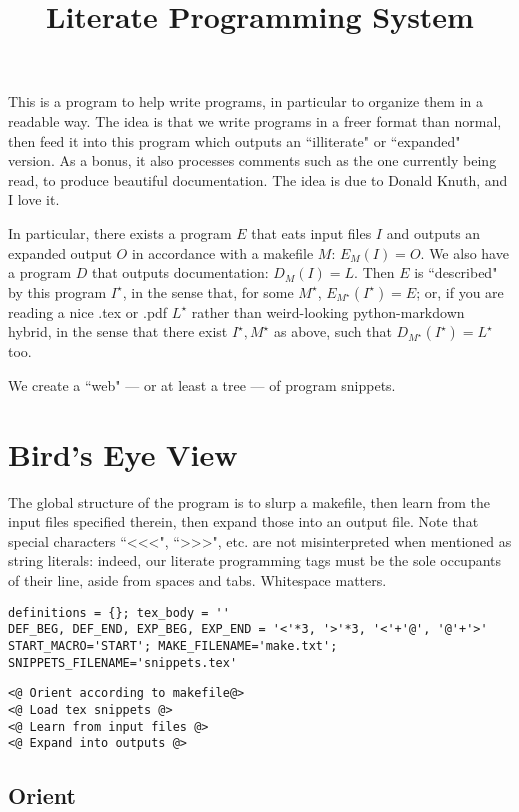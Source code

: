 \documentclass{article}
\begin{document}
\title{Literate Programming System}
\maketitle

This is a program to help write programs, in particular to organize them in a
readable way. The idea is that we write programs in a freer format than normal,
then feed it into this program which outputs an ``illiterate" or ``expanded"
version. As a bonus, it also processes comments such as the one currently being
read, to produce beautiful documentation. The idea is due to Donald Knuth, and I
love it.

In particular, there exists a program $E$ that eats input files $I$ and outputs
an expanded output $O$ in accordance with a makefile $M$: $E_M(I)=O$. We also
have a program $D$ that outputs documentation: $D_M(I)=L$. Then $E$ is
``described" by this program $I^\star$, in the sense that, for some $M^\star$,
$E_{M^\star}(I^\star)=E$; or, if you are reading a nice .tex or .pdf $L^\star$
rather than weird-looking python-markdown hybrid, in the sense that there exist
$I^\star, M^\star$ as above, such that $D_{M^\star}(I^\star)=L^\star$ too.

We create a ``web" --- or at least a tree --- of program snippets.

\section{Bird's Eye View}The global structure of the program is to slurp a makefile, then learn from the
input files specified therein, then expand those into an output file. Note that
special characters ``<<<", ``>>>", etc. are not misinterpreted when mentioned as
string literals: indeed, our literate programming tags must be the sole
occupants of their line, aside from spaces and tabs. Whitespace matters.

{\color{YellowOrange}\begin{verbatim}definitions = {}; tex_body = ''
DEF_BEG, DEF_END, EXP_BEG, EXP_END = '<'*3, '>'*3, '<'+'@', '@'+'>'
START_MACRO='START'; MAKE_FILENAME='make.txt'; SNIPPETS_FILENAME='snippets.tex'
\end{verbatim}}{\color{MidnightBlue}\begin{verbatim}<@ Orient according to makefile@>
<@ Load tex snippets @>
<@ Learn from input files @>
<@ Expand into outputs @>
\end{verbatim}}
\subsection{Orient}
\end{document}
